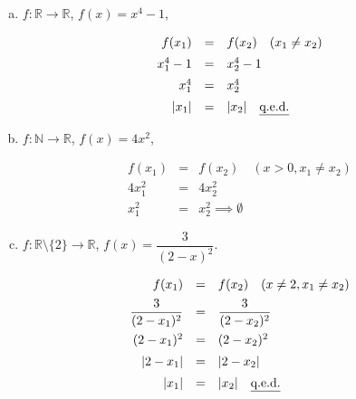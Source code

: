\documentclass[10pt, oneside]{article}
\begin{document}
\begin{enumerate}[(a)]
    \item $f : \mathbb{R} \rightarrow \mathbb{R}$, $f(x) = x^4 - 1$,

        \begin{equation*}
            \begin{array}{rcl}
                f(x_1) &=& f(x_2) \quad (x_1 \neq x_2) \\[5pt]
                x_1^4 - 1 &=& x_2^4 - 1 \\[5pt]
                x_1^4 &=& x_2^4 \\[5pt]
                |x_1| &=& |x_2| \quad \text{\underline{q.e.d.}}
            \end{array}
        \end{equation*}

    \item $f : \mathbb{N} \rightarrow \mathbb{R}$, $f(x) = 4x^2$,

        \begin{equation*}
            \begin{array}{rcl}
                f(x_1) &=& f(x_2) \quad (x > 0, x_1 \neq x_2) \\[5pt]
                4x_1^2 &=& 4x_2^2 \\[5pt]
                x_1^2 &=& x_2^2 \implies \emptyset
            \end{array}
        \end{equation*}

    \pagebreak
    \item $f : \mathbb{R} \setminus \{2\} \rightarrow \mathbb{R}$, $f(x) = \dfrac{3}{(2 - x)^2}$.

        \begin{equation*}
            \begin{array}{rcl}
                f(x_1) &=& f(x_2) \quad (x \neq 2, x_1 \neq x_2) \\[5pt]
                \dfrac{3}{(2 - x_1)^2} &=& \dfrac{3}{(2 - x_2)^2} \\[10pt]
                (2 - x_1)^2 &=& (2 - x_2)^2 \\[5pt]
                |2 - x_1| &=& |2 - x_2| \\[5pt]
                |x_1| &=& |x_2| \quad \text{\underline{q.e.d.}}
            \end{array}
        \end{equation*}

\end{enumerate}
\end{document}
